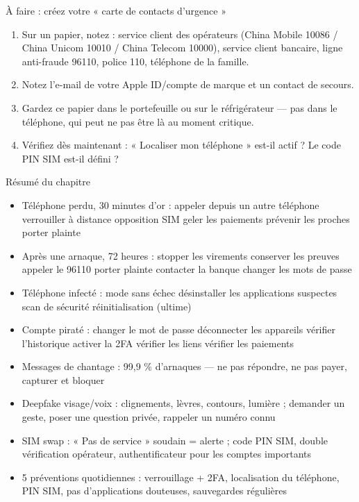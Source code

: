 \begin{tcbpractice}{À faire : créez votre « carte de contacts d'urgence »}
\begin{enumerate}
  \item Sur un papier, notez : service client des opérateurs (China Mobile 10086 / China Unicom 10010 / China Telecom 10000), service client bancaire, ligne anti-fraude 96110, police 110, téléphone de la famille.
  \item Notez l'e-mail de votre Apple ID/compte de marque et un contact de secours.
  \item Gardez ce papier dans le portefeuille ou sur le réfrigérateur — pas dans le téléphone, qui peut ne pas être là au moment critique.
  \item Vérifiez dès maintenant : « Localiser mon téléphone » est-il actif ? Le code PIN SIM est-il défini ?
\end{enumerate}

\end{tcbpractice}

\begin{tcbsummary}{Résumé du chapitre}
\begin{itemize}
  \item Téléphone perdu, 30 minutes d'or : appeler depuis un autre téléphone verrouiller à distance opposition SIM geler les paiements prévenir les proches porter plainte
  \item Après une arnaque, 72 heures : stopper les virements conserver les preuves appeler le 96110 porter plainte contacter la banque changer les mots de passe
  \item Téléphone infecté : mode sans échec désinstaller les applications suspectes scan de sécurité réinitialisation (ultime)
  \item Compte piraté : changer le mot de passe déconnecter les appareils vérifier l'historique activer la 2FA vérifier les liens vérifier les paiements
  \item Messages de chantage : 99,9 \% d'arnaques — ne pas répondre, ne pas payer, capturer et bloquer
  \item Deepfake visage/voix : clignements, lèvres, contours, lumière ; demander un geste, poser une question privée, rappeler un numéro connu
  \item SIM swap : « Pas de service » soudain = alerte ; code PIN SIM, double vérification opérateur, authentificateur pour les comptes importants
  \item 5 préventions quotidiennes : verrouillage + 2FA, localisation du téléphone, PIN SIM, pas d'applications douteuses, sauvegardes régulières
\end{itemize}

\end{tcbsummary}
